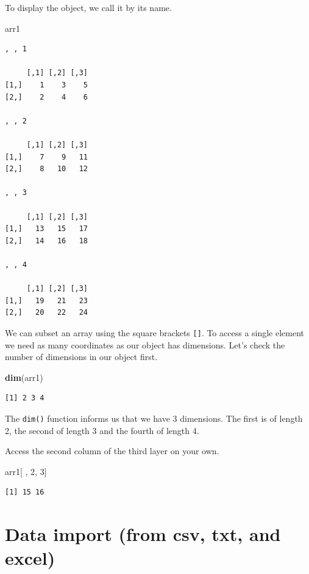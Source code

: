 \documentclass[]{article}
\newenvironment{Shaded}{\begin{snugshade}}{\end{snugshade}}
\newcommand{\DecValTok}[1]{\textcolor[rgb]{0.00,0.00,0.81}{#1}}
\newcommand{\KeywordTok}[1]{\textcolor[rgb]{0.13,0.29,0.53}{\textbf{#1}}}
\newcommand{\NormalTok}[1]{#1}
\begin{document}
To display the object, we call it by its name.

\begin{Shaded}
\begin{Highlighting}[]
\NormalTok{arr1}
\end{Highlighting}
\end{Shaded}

\begin{verbatim}
, , 1

     [,1] [,2] [,3]
[1,]    1    3    5
[2,]    2    4    6

, , 2

     [,1] [,2] [,3]
[1,]    7    9   11
[2,]    8   10   12

, , 3

     [,1] [,2] [,3]
[1,]   13   15   17
[2,]   14   16   18

, , 4

     [,1] [,2] [,3]
[1,]   19   21   23
[2,]   20   22   24
\end{verbatim}

We can subset an array using the square brackets \texttt{{[}{]}}. To access a single element we need as many coordinates as our object has dimensions. Let's check the number of dimensions in our object first.

\begin{Shaded}
\begin{Highlighting}[]
\KeywordTok{dim}\NormalTok{(arr1)}
\end{Highlighting}
\end{Shaded}

\begin{verbatim}
[1] 2 3 4
\end{verbatim}

The \texttt{dim()} function informs us that we have 3 dimensions. The first is of length 2, the second of length 3 and the fourth of length 4.

Access the second column of the third layer on your own.

\begin{Shaded}
\begin{Highlighting}[]
\NormalTok{arr1[ , }\DecValTok{2}\NormalTok{, }\DecValTok{3}\NormalTok{] }
\end{Highlighting}
\end{Shaded}

\begin{verbatim}
[1] 15 16
\end{verbatim}

\hypertarget{data-import-from-csv-txt-and-excel}{%
\section{Data import (from csv, txt, and excel)}\label{data-import-from-csv-txt-and-excel}}
\end{document}
